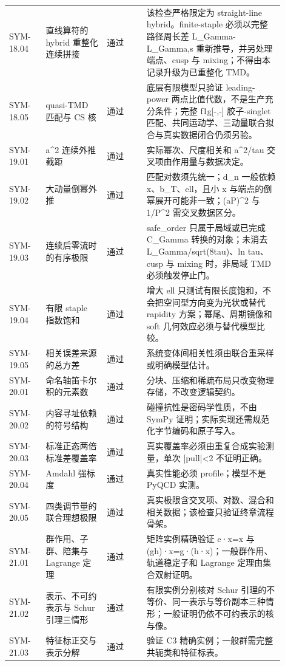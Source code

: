 \begin{longtable}{p{0.12\linewidth}p{0.20\linewidth}p{0.13\linewidth}p{0.45\linewidth}}
SYM-18.04 & 直线算符的 hybrid 重整化连续拼接 & 通过 & 该检查严格限定为 straight-line hybrid。finite-staple 必须以完整路径周长差 L\_Gamma-L\_Gamma,s 重新推导，并另处理端点、cusp 与 mixing；不得由本记录升级为已重整化 TMD。\\
SYM-18.05 & quasi-TMD 匹配与 CS 核 & 通过 & 底层有限模型只验证 leading-power 两点比值代数，不是生产充分条件；完整 f1g[-,-] 胶子-singlet 匹配、共同运动学、三动量联合拟合与真实数据闭合仍须另验。\\
SYM-19.01 & a^2 连续外推截距 & 通过 & 实际幂次、尺度相关和 a^2/tau 交叉项由作用量与数据决定。\\
SYM-19.02 & 大动量倒幂外推 & 通过 & 匹配对数须先统一；d\_n 一般依赖 x、b\_T、ell，且小 x 与端点的倒幂展开可能非一致；(aP)^2 与 1/P^2 需交叉数据区分。\\
SYM-19.03 & 连续后零流时的有序极限 & 通过 & safe\_order 只属于局域或已完成 C\_Gamma 转换的对象；未消去 L\_Gamma/sqrt(8tau)、ln tau、cusp 与 mixing 时，非局域 TMD 必须触发停止门。\\
SYM-19.04 & 有限 staple 指数饱和 & 通过 & 增大 ell 只测试有限长度饱和，不会把空间型方向变为光状或替代 rapidity 方案；幂尾、周期镜像和 soft 几何效应必须与替代模型比较。\\
SYM-19.05 & 相关误差来源的总方差 & 通过 & 系统变体间相关性须由联合重采样或明确模型估计。\\
SYM-20.01 & 命名轴笛卡尔积的元素数 & 通过 & 分块、压缩和稀疏布局只改变物理存储，不改变逻辑契约。\\
SYM-20.02 & 内容寻址依赖的符号结构 & 通过 & 碰撞抗性是密码学性质，不由 SymPy 证明；实际实现还需规范化字节编码和原子写入。\\
SYM-20.03 & 标准正态两倍标准差覆盖率 & 通过 & 真实覆盖率必须由重复合成实验测量，单次 |pull|<2 不证明正确。\\
SYM-20.04 & Amdahl 强标度 & 通过 & 真实性能必须 profile；模型不是 PyQCD 实测。\\
SYM-20.05 & 四类调节量的联合理想极限 & 通过 & 真实极限含交叉项、对数、混合和相关数据；该检查只验证终章流程骨架。\\
SYM-21.01 & 群作用、子群、陪集与 Lagrange 定理 & 通过 & 矩阵实例精确验证 e·x=x 与 (gh)·x=g·(h·x)；一般群作用、轨道稳定子和 Lagrange 定理由集合双射证明。\\
SYM-21.02 & 表示、不可约表示与 Schur 引理三情形 & 通过 & 有限实例分别核对 Schur 引理的不等价、同一表示与等价副本三种情形；一般证明仍依不可约表示的核与像。\\
SYM-21.03 & 特征标正交与表示分解 & 通过 & 验证 C3 精确实例；一般群需完整共轭类和特征标表。\\

\end{longtable}
